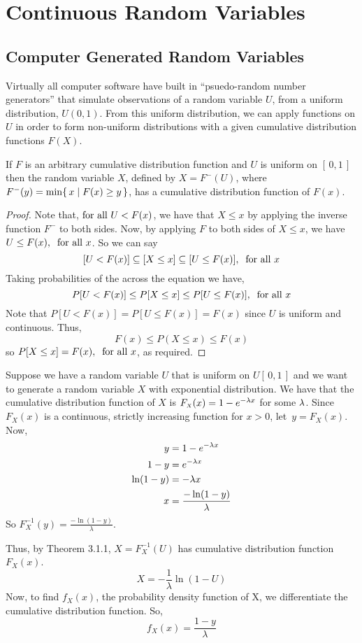 \chapter{Continuous Random Variables}

\section{Computer Generated Random Variables}
Virtually all computer software have built in ``psuedo-random number generators'' that simulate observations of a random variable $U$, from a uniform distribution, $U(0,1)$. From this uniform distribution, we can apply functions on $U$ in order to form non-uniform distributions with a given cumulative distribution functions $F(X)$.
\begin{theorem}
If $F$ is an arbitrary cumulative distribution function and $U$ is uniform on $[\,0,1\,]$ then the random variable $X$, defined by $X = F^-(U)$, where $F^-(y) = \min\{\, x \mid F(x)\ge y \,\}$, has a cumulative distribution function of $F(x)$. 
\end{theorem}

\begin{proof}
Note that,$ \text{ for }\text{all } U < F(x)$, we have that $X \leq x$ by applying the inverse function $F^-$ to both sides. Now, by applying $F$ to both sides of $X \leq x$, we have $U \leq F(x),\:\text{ for }\text{all } x$. So we can say
\[
    [U < F(x)] \subseteq [X \leq x] \subseteq [U \leq F(x)],\:\text{ for }\text{all } x
\]
Taking probabilities of the across the equation we have, 
\[
    P[U < F(x)] \leq P[X \leq x] \leq P[U \leq F(x)],\:\text{ for }\text{all } x
\]
Note that $P[U < F(x)] = P[U \leq F(x)] = F(x)$ since $U$ is uniform and continuous. Thus,
\[
    F(x) \leq P(X \leq x) \leq F(x)
\]
so $P[X \leq x] = F(x),\:\text{ for }\text{all } x$, as required.
\end{proof}

\begin{example}
Suppose we have a random variable $U$ that is uniform on $U[\,0,1\,]$ and we want to generate a random variable $X$ with exponential distribution. We have that the cumulative distribution function of $X$ is $F_{\scriptscriptstyle X}(x) = 1 - e^{-\lambda x}$ for some $\lambda$.
Since $F_{\scriptscriptstyle X}(x)$ is a continuous, strictly increasing function for $x>0$, let~$y=F_{\scriptscriptstyle X}(x)$. Now,
\begin{align*}
    y&=1-e^{-\lambda x} \\
    1-y&=e^{-\lambda x} \\
    \ln(1-y)&=-\lambda x \\
    x&=\frac{-\ln(1-y)}{\lambda}
\end{align*}
So $F^{-1}_{\scriptscriptstyle X}(y) = \displaystyle\frac{-\ln(1-y)}{\lambda}$.

Thus, by Theorem 3.1.1, $X=F^{-1}_{\scriptscriptstyle X}(U)$ has cumulative distribution function $F_{\scriptscriptstyle X}(x)$.
\[
    X = -\frac{1}{\lambda}\ln(1-U)
\]
Now, to find $f_{\scriptscriptstyle X}(x)$, the probability density function of X, we differentiate the cumulative distribution function. So,
\[
    f_{\scriptscriptstyle X}(x) = \frac{1 - y}{\lambda}
\]    
\end{example}
\pagebreak[3]
